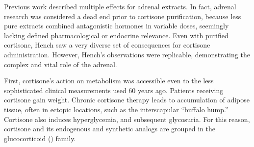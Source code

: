 \documentclass[12pt,english]{report}\usepackage[]{graphicx}\usepackage[]{color}
\begin{document}
Previous work described multiple effects for adrenal extracts. In
fact, adrenal research was considered a dead end prior to cortisone
purification, because less pure extracts combined antagonistic hormones
in variable doses, seemingly lacking defined pharmacological or endocrine
relevance. Even with purified cortisone, Hench saw a very diverse
set of consequences for cortisone administration\citep{sprague1950observations}.
However, Hench’s observations were replicable, demonstrating the complex
and vital role of the adrenal.

First, cortisone's action on metabolism was accessible even to the
less sophisticated clinical measurements used 60 years ago. Patients
receiving cortisone gain weight. Chronic cortisone therapy leads to
accumulation of adipose tissue, often in ectopic locations, such as
the interscapular ``buffalo hump.'' Cortisone also induces hyperglycemia,
and subsequent glycosuria. For this reason, cortisone and its endogenous
and synthetic analogs are grouped in the glucocorticoid ()
family.
\end{document}
